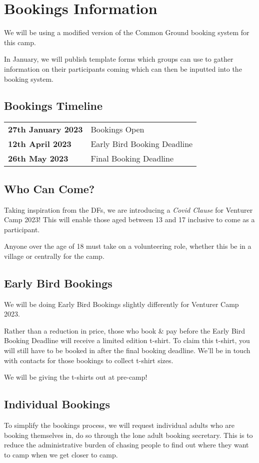 \documentclass[a4paper, 10pt]{report}
\begin{document}
\chapter{Bookings Information}
We will be using a modified version of the Common Ground booking system for this camp.

In January, we will publish template forms which groups can use to gather information on their participants coming which can then be inputted into the booking system.
\section{Bookings Timeline}
\begin{table}[H]
    \centering
\begin{tabularx}{\textwidth}{ll}
    \textbf{27th January 2023} & Bookings Open \\
    \textbf{12th April 2023} & Early Bird Booking Deadline \\
    \textbf{26th May 2023} & Final Booking Deadline
\end{tabularx}
\end{table}

\section{Who Can Come?}
Taking inspiration from the DFs, we are introducing a \textit{Covid Clause} for Venturer Camp 2023! This will enable those aged between 13 and 17 inclusive to come as a participant.

Anyone over the age of 18 must take on a volunteering role, whether this be in a village or centrally for the camp.

\section{Early Bird Bookings}
We will be doing Early Bird Bookings slightly differently for Venturer Camp 2023.

Rather than a reduction in price, those who book \& pay before the Early Bird Booking Deadline will receive a limited edition t-shirt. To claim this t-shirt, you will still have to be booked in after the final booking deadline. We'll be in touch with contacts for those bookings to collect t-shirt sizes. 

We will be giving the t-shirts out at pre-camp!
\section{Individual Bookings}
To simplify the bookings process, we will request individual adults who are booking themselves in, do so through the lone adult booking secretary. This is to reduce the administrative burden of chasing people to find out where they want to camp when we get closer to camp.
\end{document}
